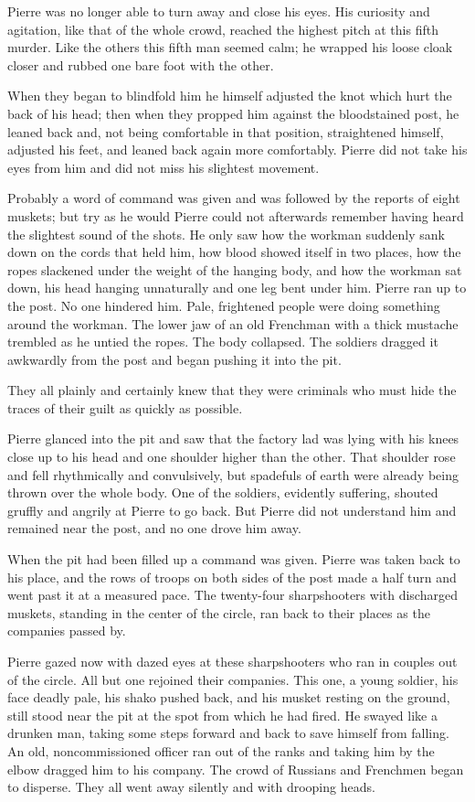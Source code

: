Pierre was no longer able to turn away and close his eyes. His
curiosity and agitation, like that of the whole crowd, reached
the highest pitch at this fifth murder. Like the others this
fifth man seemed calm; he wrapped his loose cloak closer and
rubbed one bare foot with the other.

When they began to blindfold him he himself adjusted the knot
which hurt the back of his head; then when they propped him
against the bloodstained post, he leaned back and, not being
comfortable in that position, straightened himself, adjusted his
feet, and leaned back again more comfortably. Pierre did not take
his eyes from him and did not miss his slightest movement.

Probably a word of command was given and was followed by the
reports of eight muskets; but try as he would Pierre could not
afterwards remember having heard the slightest sound of the
shots. He only saw how the workman suddenly sank down on the
cords that held him, how blood showed itself in two places, how
the ropes slackened under the weight of the hanging body, and how
the workman sat down, his head hanging unnaturally and one leg
bent under him. Pierre ran up to the post. No one hindered
him. Pale, frightened people were doing something around the
workman.  The lower jaw of an old Frenchman with a thick mustache
trembled as he untied the ropes. The body collapsed. The soldiers
dragged it awkwardly from the post and began pushing it into the
pit.

They all plainly and certainly knew that they were criminals who
must hide the traces of their guilt as quickly as possible.

Pierre glanced into the pit and saw that the factory lad was
lying with his knees close up to his head and one shoulder higher
than the other.  That shoulder rose and fell rhythmically and
convulsively, but spadefuls of earth were already being thrown
over the whole body. One of the soldiers, evidently suffering,
shouted gruffly and angrily at Pierre to go back. But Pierre did
not understand him and remained near the post, and no one drove
him away.

When the pit had been filled up a command was given. Pierre was
taken back to his place, and the rows of troops on both sides of
the post made a half turn and went past it at a measured
pace. The twenty-four sharpshooters with discharged muskets,
standing in the center of the circle, ran back to their places as
the companies passed by.

Pierre gazed now with dazed eyes at these sharpshooters who ran
in couples out of the circle. All but one rejoined their
companies. This one, a young soldier, his face deadly pale, his
shako pushed back, and his musket resting on the ground, still
stood near the pit at the spot from which he had fired. He swayed
like a drunken man, taking some steps forward and back to save
himself from falling. An old, noncommissioned officer ran out of
the ranks and taking him by the elbow dragged him to his
company. The crowd of Russians and Frenchmen began to
disperse. They all went away silently and with drooping heads.

